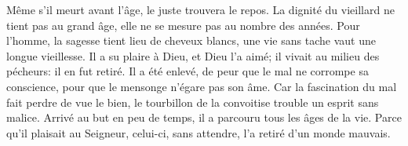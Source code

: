 Même s’il meurt avant l’âge, le juste trouvera le repos.
La dignité du vieillard ne tient pas au grand âge,
	elle ne se mesure pas au nombre des années.
Pour l’homme, la sagesse tient lieu de cheveux blancs,
	une vie sans tache vaut une longue vieillesse.
Il a su plaire à Dieu, et Dieu l’a aimé;
	il vivait au milieu des pécheurs: il en fut retiré.
Il a été enlevé, de peur que le mal ne corrompe sa conscience,
	pour que le mensonge n’égare pas son âme.
Car la fascination du mal fait perdre de vue le bien,
	le tourbillon de la convoitise trouble un esprit sans malice.
Arrivé au but en peu de temps, il a parcouru tous les âges de la vie.
Parce qu’il plaisait au Seigneur,
	celui-ci, sans attendre, l’a retiré d’un monde mauvais.
